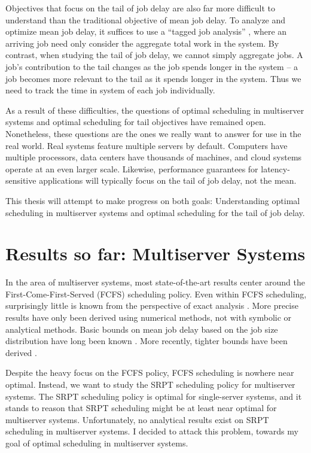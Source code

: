 \documentclass[11pt]{article}
\begin{document}
Objectives that focus on the tail of job delay are also far more difficult to understand
than the traditional objective of mean job delay.
To analyze and optimize mean job delay,
it suffices to use a ``tagged job analysis'' \cite{harchol2013performance},
where an arriving job need only consider the aggregate total work in the system.
By contrast, when studying the tail of job delay, we cannot simply aggregate jobs.
A job's contribution to the tail changes as the job spends longer in the system --
a job becomes more relevant to the tail as it spends longer in the system.
Thus we need to track the time in system of each job individually.

As a result of these difficulties,
the questions of optimal scheduling in multiserver systems
and optimal scheduling for tail objectives have remained open.
Nonetheless, these questions are the ones we really want to answer for use in the real world.
Real systems feature multiple servers by default.
Computers have multiple processors,
data centers have thousands of machines,
and cloud systems operate at an even larger scale.
Likewise, performance guarantees for latency-sensitive applications
will typically focus on the tail of job delay, not the mean.

This thesis will attempt to make progress on both goals:
Understanding optimal scheduling in multiserver systems
and optimal scheduling for the tail of job delay.

\section{Results so far: Multiserver Systems}

In the area of multiserver systems,
most state-of-the-art results center around the First-Come-First-Served (FCFS) scheduling policy.
Even within FCFS scheduling, surprisingly little is known from the perspective of exact analysis
\cite{Gupta2010} \cite{Gupta2011}.
More precise results have only been derived using numerical methods,
not with symbolic or analytical methods.
Basic bounds on mean job delay based on the job size distribution
have long been known \cite{doi:10.1111/j.2517-6161.1970.tb00819.x}.
More recently, tighter bounds have been derived \cite{daley1997some} \cite{Gupta:2011:TMB:1993744.1993792}.

Despite the heavy focus on the FCFS policy, FCFS scheduling is nowhere near optimal.
Instead, we want to study the SRPT scheduling policy for multiserver systems.
The SRPT scheduling policy is optimal for single-server systems,
and it stands to reason that SRPT scheduling might be at least near optimal
for multiserver systems.
Unfortunately, no analytical results exist on SRPT scheduling in multiserver systems.
I decided to attack this problem, towards my goal of optimal scheduling in multiserver systems.
\end{document}
